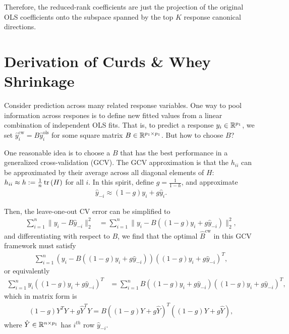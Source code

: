 Therefore, the reduced-rank coefficients are just the projection of the original
OLS coefficients onto the subspace spanned by the top $K$ response canonical
directions.

\section{Derivation of Curds \& Whey Shrinkage}
\label{subsec:derivation_curds_and_whey}

Consider prediction across many related response variables. One way to pool
information across respones is to define new fitted values from a linear
combination of independent OLS fits. That is, to predict a response $y_{i} \in
\mathbb{R}^{p_{1}}$, we set $\hat{y}^{\text{cw}}_{i} = B\hat{y}^{\text{ols}}_{i}$
for some square matrix $B \in \mathbb{R}^{p_{1} \times p_{1}}$. But how to choose
$B$?

One reasonable idea is to choose a $B$ that has the best performance in a
generalized cross-validation (GCV). The GCV approximation is that the $h_{ii}$
can be approximated by their average across all diagonal elements of $H$:
$h_{ii} \approx h := \frac{1}{n}\mathop\mathrm{tr}\left(H\right)$ for all $i$. In this spirit,
define $g = \frac{1}{1 - h}$, and approximate
\begin{align*}
  \hat{y}_{-i} \approx \left(1 - g\right)y_{i} + g\hat{y}_{i}.
\end{align*}

Then, the leave-one-out CV error can be simplified to
\begin{align*}
  \sum_{i = 1}^{n}\|y_{i} - B\hat{y}_{-i}\|_{2}^{2} &= \sum_{i =
    1}^{n} \|y_{i} - B\left(\left(1 - g\right)y_{i} +
    g\hat{y}_{-i}\right)\|_{2}^{2},
\end{align*}
and differentiating with respect to $B$, we find that the optimal
$\hat{B}^{\text{cw}}$ in this GCV framework must satisfy
\begin{align*}
\sum_{i = 1}^{n}\left(y_{i} - B\left(\left(1 - g\right)y_{i} +
    g\hat{y}_{-i}\right)\right)\left(\left(1 - g\right)y_{i} +
  g\hat{y}_{-i}\right)^{T},
\end{align*}
or equivalently
\begin{align*}
\sum_{i = 1}^{n} y_{i}\left(\left(1 - g\right)y_{i} +
  g\hat{y}_{-i}\right)^{T} &=  \sum_{i = 1}^{n}B\left(\left(1 -
    g\right)y_{i} + g\hat{y}_{-i}\right)\left(\left(1 - g\right)y_{i}
  +  g\hat{y}_{-i}\right)^{T},
\end{align*}
which in matrix form is
\begin{align}
\left(1 - g\right)Y^{T}Y + g\hat{Y}^{T}Y = B\left(\left(1 - g\right)Y
  + g \hat{Y}\right)^{T}\left(\left(1 - g\right)Y + g \hat{Y}\right), \label{eq:gcv_mat_form}
\end{align}
where $\hat{Y} \in \mathbb{R}^{n \times p_{1}}$ has $i^{th}$ row
$\hat{y}_{-i}$.

